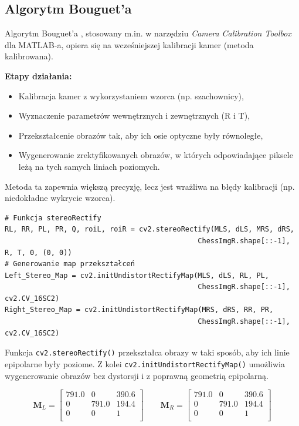\documentclass[magisterska]{pracadypl}
\begin{document}
\subsection*{Algorytm Bouguet’a}

Algorytm Bouguet’a \cite{bouget}, stosowany m.in. w narzędziu \textit{Camera Calibration Toolbox} dla MATLAB-a, opiera się na wcześniejszej kalibracji kamer (metoda kalibrowana).

\textbf{Etapy działania:}
\begin{itemize}
    \item Kalibracja kamer z wykorzystaniem wzorca (np. szachownicy),
    \item Wyznaczenie parametrów wewnętrznych i zewnętrznych (R i T),
    \item Przekształcenie obrazów tak, aby ich osie optyczne były równoległe,
    \item Wygenerowanie zrektyfikowanych obrazów, w których odpowiadające piksele leżą na tych samych liniach poziomych.
\end{itemize}

Metoda ta zapewnia większą precyzję, lecz jest wrażliwa na błędy kalibracji (np. niedokładne wykrycie wzorca).

\begin{lstlisting}[style=mypython]
# Funkcja stereoRectify
RL, RR, PL, PR, Q, roiL, roiR = cv2.stereoRectify(MLS, dLS, MRS, dRS,
                                              ChessImgR.shape[::-1], R, T, 0, (0, 0))
# Generowanie map przekształceń
Left_Stereo_Map = cv2.initUndistortRectifyMap(MLS, dLS, RL, PL,
                                              ChessImgR.shape[::-1], cv2.CV_16SC2)
Right_Stereo_Map = cv2.initUndistortRectifyMap(MRS, dRS, RR, PR,
                                              ChessImgR.shape[::-1], cv2.CV_16SC2)
\end{lstlisting}

Funkcja \texttt{cv2.stereoRectify()} przekształca obrazy w taki sposób, aby ich linie epipolarne były poziome. Z kolei \texttt{cv2.initUndistortRectifyMap()} umożliwia wygenerowanie obrazów bez dystorsji i z poprawną geometrią epipolarną.

\[
\mathbf{M}_L =
\begin{bmatrix}
791.0 & 0 & 390.6 \\
0 & 791.0 & 194.4 \\
0 & 0 & 1 \\
\end{bmatrix}
\qquad
\mathbf{M}_R =
\begin{bmatrix}
791.0 & 0 & 390.6 \\
0 & 791.0 & 194.4 \\
0 & 0 & 1 \\
\end{bmatrix}
\]
\end{document}
